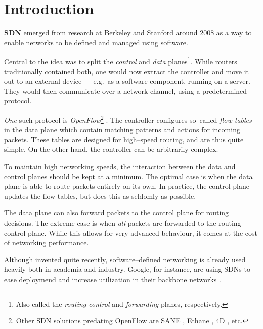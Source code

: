 \chapter{Introduction}

\textbf{\acf{SDN}} \cite{Casado:2005:VNS:1047344.1047383} emerged from
research at Berkeley and Stanford around 2008 as a way to enable networks to
be defined and managed using software.

Central to the idea was to split the {\em control} and {\em data}
planes\footnote{Also called the {\em routing control} and {\em forwarding}
planes, respectively.}.
%
While routers traditionally contained both, one would now extract the
controller and move it out to an external device --- e.g.~as a software
component, running on a server.  They would then communicate over a network
channel, using a predetermined protocol.

{\em One} such protocol is {\em OpenFlow}\footnote{Other
\ac{SDN} solutions predating OpenFlow are SANE
\cite{Casado:2006:SPA:1267336.1267346}, Ethane
\cite{Casado:2007:ETC:1282427.1282382}, 4D
\cite{Greenberg:2005:CSA:1096536.1096541}, etc.}
\cite{McKeown:2008:OEI:1355734.1355746}. 
The controller configures so--called {\em flow tables} in the
data plane  which contain matching patterns and actions
for incoming packets.  These tables are designed for high--speed routing,
and are thus quite simple.  On the other hand, the controller can be
arbitrarily complex.

To maintain high networking speeds, the interaction between the data and
control planes should be kept at a minimum.  The optimal case is when the
data plane is able to route packets entirely on its own.  In practice, the
control plane updates the flow tables, but does this as seldomly as
possible.

The data plane can also forward packets to the control plane for routing decisions. The extreme case is when {\em all} packets are
forwarded to the routing control plane.  While this allows for very advanced
behaviour, it comes at the cost of networking performance.

Although invented quite recently, software--defined networking is already
used heavily both in academia and industry.  Google, for instance, are using
\acp{SDN} to ease deploymend and increase utilization in their backbone
networks \cite{crabbe2012sdn}.

